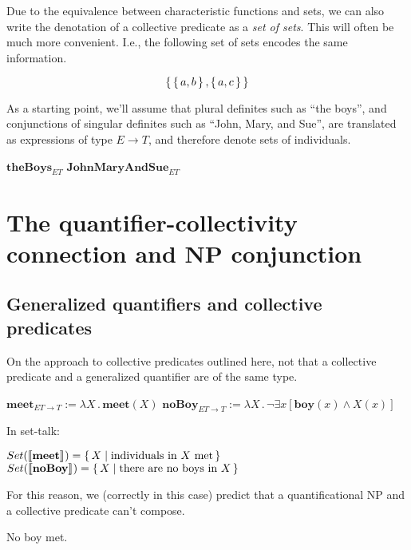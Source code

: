 \documentclass[letterpaper,parskip=half]{scrartcl}
\begin{document}
Due to the equivalence between characteristic functions and sets, we can also write the denotation of a collective predicate as a \emph{set of sets}. This will often be much more convenient. I.e., the following set of sets encodes the same information.

\[\set{\set{a,b},\set{a,c}}\]

As a starting point, we'll assume that plural definites such as ``the boys'', and conjunctions of singular definites such as ``John, Mary, and Sue'', are translated as expressions of type \(E \to T\), and therefore denote sets of individuals.

\begin{exe}
\ex \(\mathbf{theBoys}_{ET}\)
\ex \(\mathbf{JohnMaryAndSue}_{ET}\)
\label{org99991fd}
\end{exe}

\section{The quantifier-collectivity connection and NP conjunction}
\label{sec:org2881e11}

\subsection{Generalized quantifiers and collective predicates}
\label{sec:org8131195}

On the approach to collective predicates outlined here, not that a collective predicate and a generalized quantifier are of the same type.

\begin{exe}
\ex \(\mathbf{meet}_{ET \to T} := \lambda X\,.\,\mathbf{meet}(X)\)
\ex \(\mathbf{noBoy}_{ET \to T} := \lambda X\,.\,\neg\exists x[\mathbf{boy}(x) \wedge X(x)]\)
\label{org97ba063}
\end{exe}

In set-talk:

\begin{exe}
\ex \(Set(\eval*{\mathbf{meet}}) = \set{X | \text{individuals in } X\text{ met}}\)
\ex \(Set(\eval*{\mathbf{noBoy}}) = \set{X | \text{there are no boys in }X }\)
\label{org1d45a63}
\end{exe}

For this reason, we (correctly in this case) predict that a quantificational NP and a collective predicate can't compose.

\begin{exe}
\ex *No boy met.
\label{org9b10039}
\end{exe}
\end{document}
